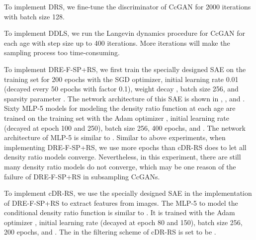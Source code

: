 \documentclass[final,12pt, 3p,times]{elsarticle}
\begin{document}
To implement DRS, we fine-tune the discriminator of CcGAN for 2000 iterations with batch size 128.  

To implement DDLS, we run the Langevin dynamics procedure for CcGAN for each age with step size  up to 400 iterations. More iterations will make the sampling process too time-consuming.

To implement DRE-F-SP+RS, we first train the specially designed SAE on the training set for 200 epochs with the SGD optimizer, initial learning rate 0.01 (decayed every 50 epochs with factor 0.1), weight decay , batch size 256, and sparsity parameter . The network architecture of this SAE is shown in , , and . Sixty MLP-5 models for modeling the density ratio function at each age are trained on the training set with the Adam optimizer \cite{kingma2014adam}, initial learning rate  (decayed at epoch 100 and 250), batch size 256, 400 epochs, and . The network architecture of MLP-5 is similar to . Similar to above experiments, when implementing DRE-F-SP+RS, we use more epochs than cDR-RS does to let all density ratio models converge. Nevertheless, in this experiment, there are still many density ratio models do not converge, which may be one reason of the failure of DRE-F-SP+RS in subsampling CcGANs.

To implement cDR-RS, we use the specially designed SAE in the implementation of DRE-F-SP+RS to extract features from images. The MLP-5 to model the conditional density ratio function is similar to . It is trained with the Adam optimizer \cite{kingma2014adam}, initial learning rate  (decayed at epoch 80 and 150), batch size 256, 200 epochs, and . The  in the filtering scheme of cDR-RS is set to be . 
\end{document}
